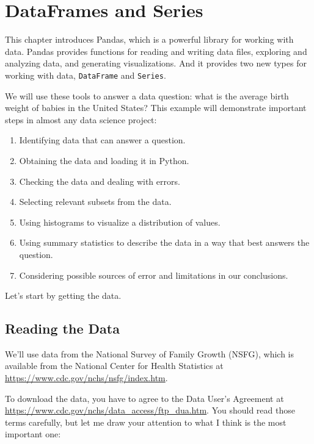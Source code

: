 \hypertarget{dataframes-and-series}{%
\chapter{DataFrames and Series}\label{dataframes-and-series}}

This chapter introduces Pandas, which is a powerful library for working
with data. Pandas provides functions for reading and writing data files,
exploring and analyzing data, and generating visualizations. And it
provides two new types for working with data,
\passthrough{\lstinline!DataFrame!} and
\passthrough{\lstinline!Series!}.

We will use these tools to answer a data question: what is the average
birth weight of babies in the United States? This example will
demonstrate important steps in almost any data science project:

\begin{enumerate}
\def\labelenumi{\arabic{enumi}.}
\item
  Identifying data that can answer a question.
\item
  Obtaining the data and loading it in Python.
\item
  Checking the data and dealing with errors.
\item
  Selecting relevant subsets from the data.
\item
  Using histograms to visualize a distribution of values.
\item
  Using summary statistics to describe the data in a way that best
  answers the question.
\item
  Considering possible sources of error and limitations in our
  conclusions.
\end{enumerate}

Let's start by getting the data.

\hypertarget{reading-the-data}{%
\section{Reading the Data}\label{reading-the-data}}

We'll use data from the National Survey of Family Growth (NSFG), which
is available from the National Center for Health Statistics at
\url{https://www.cdc.gov/nchs/nsfg/index.htm}.

To download the data, you have to agree to the Data User's Agreement at
\url{https://www.cdc.gov/nchs/data_access/ftp_dua.htm}. You should read
those terms carefully, but let me draw your attention to what I think is
the most important one:


